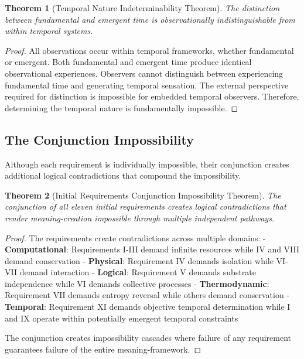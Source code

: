 \documentclass[12pt,a4paper]{article}
\newtheorem{theorem}{Theorem}[section]
\begin{document}
\begin{theorem}[Temporal Nature Indeterminability Theorem]
The distinction between fundamental and emergent time is observationally indistinguishable from within temporal systems.
\end{theorem}

\begin{proof}
All observations occur within temporal frameworks, whether fundamental or emergent. Both fundamental and emergent time produce identical observational experiences. Observers cannot distinguish between experiencing fundamental time and generating temporal sensation. The external perspective required for distinction is impossible for embedded temporal observers. Therefore, determining the temporal nature is fundamentally impossible.
\end{proof}

\subsection{The Conjunction Impossibility}

Although each requirement is individually impossible, their conjunction creates additional logical contradictions that compound the impossibility.

\begin{theorem}[Initial Requirements Conjunction Impossibility Theorem]
The conjunction of all eleven initial requirements creates logical contradictions that render meaning-creation impossible through multiple independent pathways.
\end{theorem}

\begin{proof}
The requirements create contradictions across multiple domains:
- \textbf{Computational}: Requirements I-III demand infinite resources while IV and VIII demand conservation
- \textbf{Physical}: Requirement IV demands isolation while VI-VII demand interaction
- \textbf{Logical}: Requirement V demands substrate independence while VI demands collective processes
- \textbf{Thermodynamic}: Requirement VII demands entropy reversal while others demand conservation
- \textbf{Temporal}: Requirement XI demands objective temporal determination while I and IX operate within potentially emergent temporal constraints

The conjunction creates impossibility cascades where failure of any requirement guarantees failure of the entire meaning-framework.
\end{proof}
\end{document}
